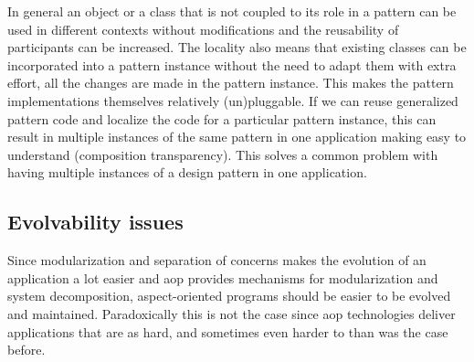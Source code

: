 

In general an object or a class that is not coupled to its role in a pattern can be used in different contexts without modifications and the reusability of participants can be increased. 
The locality also means that existing classes can be incorporated into a pattern instance without the need to adapt them with extra effort, all the changes are made in the pattern instance. 
This makes the pattern implementations themselves relatively (un)pluggable. 
If we can reuse generalized pattern code and localize the code for a particular pattern instance, this can result in multiple instances of the same pattern in one application making easy to understand (composition transparency). 
This solves a common problem with having multiple instances of a design pattern in one application.

\subsection{Evolvability issues}\label{Aspect Oriented Programming Evolvability}
Since modularization and separation of concerns makes the evolution of an application a lot easier and \ac{aop} provides mechanisms for modularization and system decomposition, aspect-oriented programs should be easier to be evolved and maintained.
Paradoxically this is not the case \cite{tourwe2003existence} since \ac{aop} technologies deliver applications that are as hard, and sometimes even harder to than was the case before.

